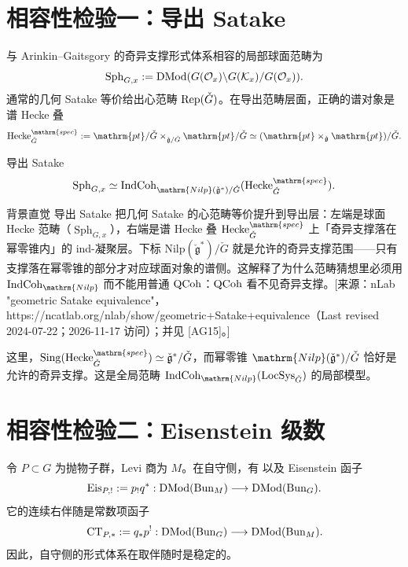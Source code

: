 \section{相容性检验一：导出 Satake}\label{sec:10.3}
与 Arinkin–Gaitsgory 的奇异支撑形式体系\cite{AG15}相容的局部球面范畴为
\[\operatorname{Sph}_{G,x}:=\operatorname{DMod}(G(\mathcal{O}_x)\backslash G(\mathcal K_x)/G(\mathcal{O}_x)).\]
通常的几何 Satake 等价给出心范畴 $\operatorname{Rep}(\check{G})$。在导出范畴层面，正确的谱对象是谱 Hecke 叠
\[\Hecke^{\mathrm{spec}}_{\checkG}:=\mathrm{pt}/\checkG\times_{\check{\mathfrak g}/\checkG}\mathrm{pt}/\checkG
\simeq(\mathrm{pt}\times_{\check{\mathfrak g}}\mathrm{pt})/\checkG.\]
\begin{theorem*}{导出 Satake}
\[\operatorname{Sph}_{G,x}\simeq\IndCoh_{\mathrm{Nilp}(\check{\mathfrak g}^*)/\checkG}(\Hecke^{\mathrm{spec}}_{\checkG}).\]

\begin{transnote}{背景直觉}
导出 Satake 把几何 Satake 的心范畴等价提升到导出层：左端是球面 Hecke 范畴（$\operatorname{Sph}_{G,x}$），右端是谱 Hecke 叠 $\Hecke^{\mathrm{spec}}_{\check G}$ 上「奇异支撑落在幂零锥内」的 ind-凝聚层。下标 $\mathrm{Nilp}(\check{\mathfrak g}^*)/\check G$ 就是允许的奇异支撑范围——只有支撑落在幂零锥的部分才对应球面对象的谱侧。这解释了为什么范畴猜想里必须用 $\IndCoh_{\mathrm{Nilp}}$ 而不能用普通 $\operatorname{QCoh}$：$\operatorname{QCoh}$ 看不见奇异支撑。[来源：nLab "geometric Satake equivalence"，https://ncatlab.org/nlab/show/geometric+Satake+equivalence（Last revised 2024-07-22；2026-11-17 访问）；并见 [AG15]。]
\end{transnote}
\end{theorem*}
这里，$\operatorname{Sing}(\Hecke^{\mathrm{spec}}_{\checkG})\simeq\check{\mathfrak g}^*/\checkG$，而幂零锥 $\mathrm{Nilp}(\check{\mathfrak g}^*)/\checkG$ 恰好是允许的奇异支撑。这是全局范畴 $\IndCoh_{\mathrm{Nilp}}(\LocSys_{\checkG})$ 的局部模型。

\section{相容性检验二：Eisenstein 级数}\label{sec:10.4}
令 $P\subset G$ 为抛物子群，Levi 商为 $M$。在自守侧，有
以及 Eisenstein 函子
\[\operatorname{Eis}_{P,!}:=p_!q^*:\operatorname{DMod}(\operatorname{Bun}_M)\longrightarrow\operatorname{DMod}(\operatorname{Bun}_G).\]
它的连续右伴随是常数项函子
\[\operatorname{CT}_{P,*}:=q_*p^!:\operatorname{DMod}(\operatorname{Bun}_G)\longrightarrow\operatorname{DMod}(\operatorname{Bun}_M).\]
因此，自守侧的形式体系在取伴随时是稳定的。

